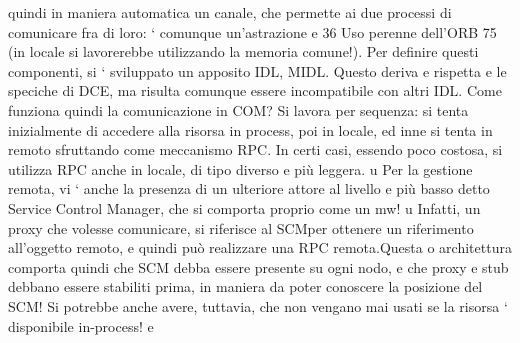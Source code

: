 \documentclass[a4paper,12pt]{article}
\begin{document}
quindi in maniera automatica un canale,
che permette ai due processi di comunicare fra di loro: ` comunque un'astrazione
e
36 Uso
perenne dell'ORB
75
(in locale si lavorerebbe utilizzando la memoria comune!). Per definire questi
componenti, si ` sviluppato un apposito IDL, MIDL. Questo deriva e rispetta
e
le speciche di DCE, ma risulta comunque essere incompatibile con altri IDL.
Come funziona quindi la comunicazione in COM? Si lavora per sequenza: si
tenta inizialmente di accedere alla risorsa in process, poi in locale, ed inne si
tenta in remoto sfruttando come meccanismo RPC. In certi casi, essendo poco
costosa, si utilizza RPC anche in locale, di tipo diverso e più leggera.
u
Per la gestione remota, vi ` anche la presenza di un ulteriore attore al livello
e
più basso detto Service Control Manager, che si comporta proprio come un mw!
u
Infatti, un proxy che volesse comunicare, si riferisce al SCMper ottenere un
riferimento all'oggetto remoto, e quindi può realizzare una RPC remota.Questa
o
architettura comporta quindi che SCM debba essere presente su ogni nodo, e
che proxy e stub debbano essere stabiliti prima, in maniera da poter conoscere
la posizione del SCM! Si potrebbe anche avere, tuttavia, che non vengano mai
usati se la risorsa ` disponibile in-process!
e
\end{document}
